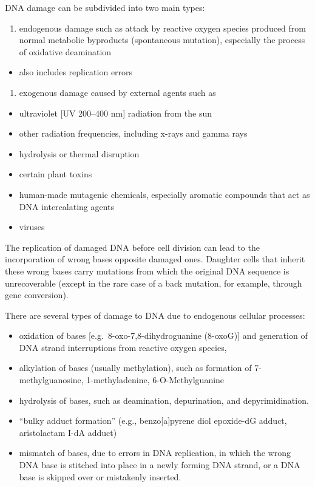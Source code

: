 DNA damage can be subdivided into two main types:

\begin{enumerate}
\def\labelenumi{\arabic{enumi}.}
\tightlist
\item
  endogenous damage such as attack by reactive oxygen species produced from normal metabolic byproducts (spontaneous mutation), especially the process of oxidative deamination
\end{enumerate}

\begin{itemize}
\tightlist
\item
  also includes replication errors
\end{itemize}

\begin{enumerate}
\def\labelenumi{\arabic{enumi}.}
\tightlist
\item
  exogenous damage caused by external agents such as
\end{enumerate}

\begin{itemize}
\tightlist
\item
  ultraviolet {[}UV 200--400 nm{]} radiation from the sun
\item
  other radiation frequencies, including x-rays and gamma rays
\item
  hydrolysis or thermal disruption
\item
  certain plant toxins
\item
  human-made mutagenic chemicals, especially aromatic compounds that act as DNA intercalating agents
\item
  viruses
\end{itemize}

The replication of damaged DNA before cell division can lead to the incorporation of wrong bases opposite damaged ones. Daughter cells that inherit these wrong bases carry mutations from which the original DNA sequence is unrecoverable (except in the rare case of a back mutation, for example, through gene conversion).

There are several types of damage to DNA due to endogenous cellular processes:

\begin{itemize}
\tightlist
\item
  oxidation of bases {[}e.g.~8-oxo-7,8-dihydroguanine (8-oxoG){]} and generation of DNA strand interruptions from reactive oxygen species,
\item
  alkylation of bases (usually methylation), such as formation of 7-methylguanosine, 1-methyladenine, 6-O-Methylguanine
\item
  hydrolysis of bases, such as deamination, depurination, and depyrimidination.
\item
  ``bulky adduct formation'' (e.g., benzo{[}a{]}pyrene diol epoxide-dG adduct, aristolactam I-dA adduct)
\item
  mismatch of bases, due to errors in DNA replication, in which the wrong DNA base is stitched into place in a newly forming DNA strand, or a DNA base is skipped over or mistakenly inserted.
\end{itemize}

